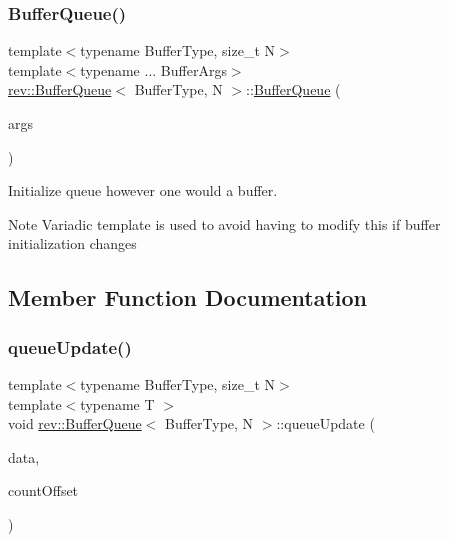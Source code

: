 \subsubsection{\texorpdfstring{BufferQueue()}{BufferQueue()}}
{\footnotesize\ttfamily template$<$typename Buffer\+Type, size\+\_\+t N$>$ \\
template$<$typename ... Buffer\+Args$>$ \\
\mbox{\hyperlink{classrev_1_1_buffer_queue}{rev\+::\+Buffer\+Queue}}$<$ Buffer\+Type, N $>$\+::\mbox{\hyperlink{classrev_1_1_buffer_queue}{Buffer\+Queue}} (\begin{DoxyParamCaption}\item[{Buffer\+Args \&\&...}]{args }\end{DoxyParamCaption})\hspace{0.3cm}{\ttfamily [inline]}}



Initialize queue however one would a buffer. 

\begin{DoxyNote}{Note}
Variadic template is used to avoid having to modify this if buffer initialization changes 
\end{DoxyNote}


\subsection{Member Function Documentation}
\mbox{\label{classrev_1_1_buffer_queue_a394c0cafdcabefca01f6f4dfa16d9009}} 
\subsubsection{\texorpdfstring{queueUpdate()}{queueUpdate()}}
{\footnotesize\ttfamily template$<$typename Buffer\+Type, size\+\_\+t N$>$ \\
template$<$typename T $>$ \\
void \mbox{\hyperlink{classrev_1_1_buffer_queue}{rev\+::\+Buffer\+Queue}}$<$ Buffer\+Type, N $>$\+::queue\+Update (\begin{DoxyParamCaption}\item[{const T \&}]{data,  }\item[{unsigned long}]{count\+Offset }\end{DoxyParamCaption})\hspace{0.3cm}{\ttfamily [inline]}}



